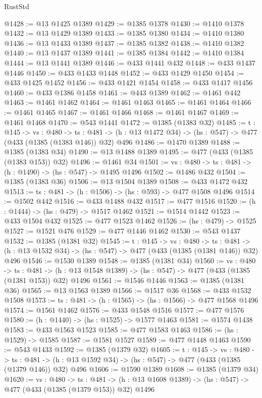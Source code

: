 \begin{lexlean}{RustStd}
\begin{coremodule}
@1428 := @13 @1425 @1389
@1429 := @1385 @1378
@1430 := @1410 @1378
@1432 := @13 @1429 @1389
@1433 := @1385 @1380
@1434 := @1410 @1380
@1436 := @13 @1433 @1389
@1437 := @1385 @1382
@1438 := @1410 @1382
@1440 := @13 @1437 @1389
@1441 := @1385 @1384
@1442 := @1410 @1384
@1444 := @13 @1441 @1389
@1446 := @433 @1441 @432
@1448 := @433 @1437 @1446
@1450 := @433 @1433 @1448
@1452 := @433 @1429 @1450
@1454 := @433 @1425 @1452
@1456 := @433 @1421 @1454
@1458 := @433 @1417 @1456
@1460 := @433 @1386 @1458
@1461 := @443 @1389
@1462 := @1461 @442
@1463 := @1461 @1462
@1464 := @1461 @1463
@1465 := @1461 @1464
@1466 := @1461 @1465
@1467 := @1461 @1466
@1468 := @1461 @1467
@1469 := @1461 @1468
@1470 := @543 @1441
@1472 := @1385 (@1383 @32)
@1485 := {t : @145} ->
  {vs : @480} ->
  {ts : @481} -> (h : @13 @1472 @34) -> (hs : @547) -> @477 (@433 (@1385 (@1383 @146)) @32) @496
@1486 := @1470 @1389
@1488 := @1385 (@1383 @34)
@1490 := @13 @1488 @1389
@1495 := @477 (@433 (@1385 (@1383 @153)) @32)
@1496 := @1461 @34
@1501 := {vs : @480} -> {ts : @481} -> (h : @1490) -> (hs : @547) -> @1495 @1496
@1502 := @1486 @432
@1504 := @1385 (@1383 @36)
@1506 := @13 @1504 @1389
@1508 := @433 @1472 @432
@1513 := {ts : @481} -> (h : @1506) -> (hs : @593) -> @477 @1508 @1496
@1514 := @1502 @442
@1516 := @433 @1488 @432
@1517 := @477 @1516
@1520 := (h : @1444) -> (hs : @479) -> @1517 @1462
@1521 := @1514 @1442
@1523 := @433 @1504 @432
@1525 := @477 @1523 @1462
@1526 := (hs : @479) -> @1525
@1527 := @1521 @476
@1529 := @477 @1446 @1462
@1530 := @543 @1437
@1532 := @1385 (@1381 @32)
@1545 := {t : @145} ->
  {vs : @480} ->
  {ts : @481} -> (h : @13 @1532 @34) -> (hs : @547) -> @477 (@433 (@1385 (@1381 @146)) @32) @496
@1546 := @1530 @1389
@1548 := @1385 (@1381 @34)
@1560 := {vs : @480} ->
  {ts : @481} -> (h : @13 @1548 @1389) -> (hs : @547) -> @477 (@433 (@1385 (@1381 @153)) @32) @1496
@1561 := @1546 @1446
@1563 := @1385 (@1381 @36)
@1565 := @13 @1563 @1389
@1566 := @1517 @36
@1568 := @433 @1532 @1508
@1573 := {ts : @481} -> (h : @1565) -> (hs : @1566) -> @477 @1568 @1496
@1574 := @1561 @1462
@1576 := @433 @1548 @1516
@1577 := @477 @1576
@1580 := (h : @1440) -> (hs : @1525) -> @1577 @1463
@1581 := @1574 @1438
@1583 := @433 @1563 @1523
@1585 := @477 @1583 @1463
@1586 := (hs : @1529) -> @1585
@1587 := @1581 @1527
@1589 := @477 @1448 @1463
@1590 := @543 @1433
@1592 := @1385 (@1379 @32)
@1605 := {t : @145} ->
  {vs : @480} ->
  {ts : @481} -> (h : @13 @1592 @34) -> (hs : @547) -> @477 (@433 (@1385 (@1379 @146)) @32) @496
@1606 := @1590 @1389
@1608 := @1385 (@1379 @34)
@1620 := {vs : @480} ->
  {ts : @481} -> (h : @13 @1608 @1389) -> (hs : @547) -> @477 (@433 (@1385 (@1379 @153)) @32) @1496

\end{coremodule}
\end{lexlean}
